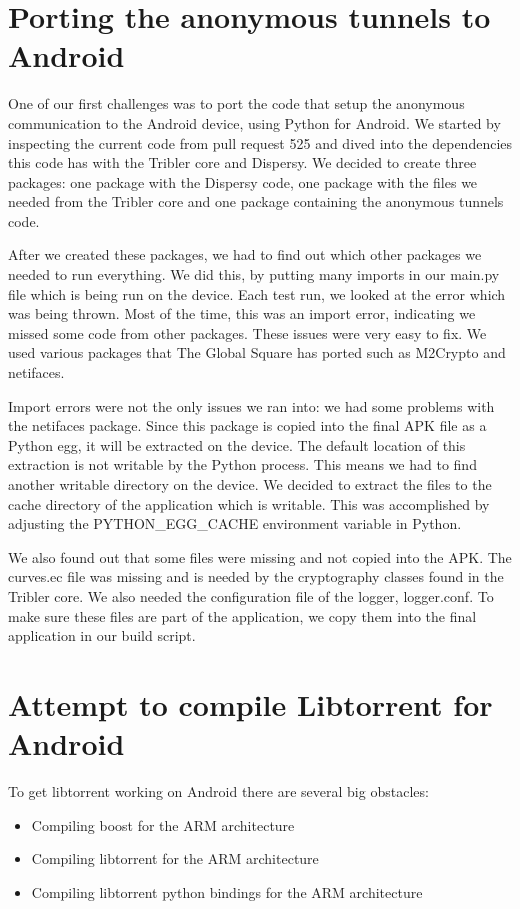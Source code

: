 	\section{Porting the anonymous tunnels to Android}
		One of our first challenges was to port the code that setup the anonymous communication to the Android device, using Python for Android. We started by inspecting the current code from pull request 525 and dived into the dependencies this code has with the Tribler core and Dispersy. We decided to create three packages: one package with the Dispersy code, one package with the files we needed from the Tribler core and one package containing the anonymous tunnels code.
		
		After we created these packages, we had to find out which other packages we needed to run everything. We did this, by putting many imports in our main.py file which is being run on the device. Each test run, we looked at the error which was being thrown. Most of the time, this was an import error, indicating we missed some code from other packages. These issues were very easy to fix. We used various packages that The Global Square has ported such as M2Crypto and netifaces.
		
		Import errors were not the only issues we ran into: we had some problems with the netifaces package. Since this package is copied into the final APK file as a Python egg, it will be extracted on the device. The default location of this extraction is not writable by the Python process. This means we had to find another writable directory on the device. We decided to extract the files to the cache directory of the application which is writable. This was accomplished by adjusting the PYTHON\_EGG\_CACHE environment variable in Python.
		
		We also found out that some files were missing and not copied into the APK. The curves.ec file was missing and is needed by the cryptography classes found in the Tribler core. We also needed the configuration file of the logger, logger.conf. To make sure these files are part of the application, we copy them into the final application in our build script.
		
	\section{Attempt to compile Libtorrent for Android}
		To get libtorrent working on Android there are several big obstacles:
		\begin{itemize}
			\item Compiling boost for the ARM architecture
			\item Compiling libtorrent for the ARM architecture
			\item Compiling libtorrent python bindings for the ARM architecture
		\end{itemize}
		
